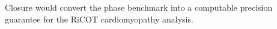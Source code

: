 Closure would convert the phase benchmark into a computable precision guarantee for the RiCOT cardiomyopathy analysis.